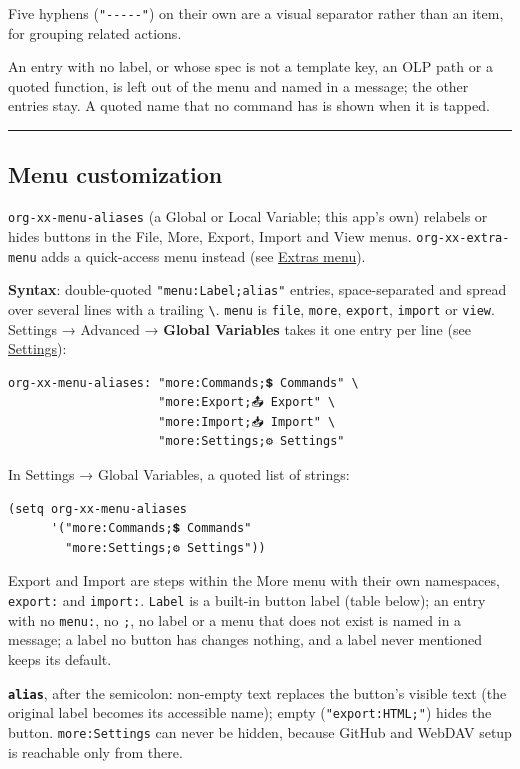 \documentclass[11pt]{article}
\begin{document}
Five hyphens (\texttt{"-{}-{}-{}-{}-"}) on their own are a visual separator rather than an item, for grouping related actions.

An entry with no label, or whose spec is not a template key, an OLP path or a quoted function, is left out of the menu and named in a message; the other entries stay. A quoted name that no command has is shown when it is tapped.

\noindent\rule{\textwidth}{0.5pt}

\subsection{Menu customization}
\label{sec:orgc0b0953}
\texttt{org-xx-menu-aliases} (a Global or Local Variable; this app's own) relabels or hides buttons in the File, More, Export, Import and View menus. \texttt{org-xx-extra-menu} adds a quick-access menu instead (see \hyperref[sec:org147f9a0]{Extras menu}).

\textbf{Syntax}: double-quoted \texttt{"menu:Label;alias"} entries, space-separated and spread over several lines with a trailing \texttt{\textbackslash{}}. \texttt{menu} is \texttt{file}, \texttt{more}, \texttt{export}, \texttt{import} or \texttt{view}. Settings → Advanced → \textbf{Global Variables} takes it one entry per line (see \hyperref[sec:org788d206]{Settings}):

\begin{verbatim}
org-xx-menu-aliases: "more:Commands;💲 Commands" \
                     "more:Export;📤 Export" \
                     "more:Import;📥 Import" \
                     "more:Settings;⚙️ Settings"
\end{verbatim}

In Settings → Global Variables, a quoted list of strings:

\begin{verbatim}
(setq org-xx-menu-aliases
      '("more:Commands;💲 Commands"
        "more:Settings;⚙️ Settings"))
\end{verbatim}

Export and Import are steps within the More menu with their own namespaces, \texttt{export:} and \texttt{import:}. \texttt{Label} is a built-in button label (table below); an entry with no \texttt{menu:}, no \texttt{;}, no label or a menu that does not exist is named in a message; a label no button has changes nothing, and a label never mentioned keeps its default.

\textbf{\texttt{alias}}, after the semicolon: non-empty text replaces the button's visible text (the original label becomes its accessible name); empty (\texttt{"export:HTML;"}) hides the button. \texttt{more:Settings} can never be hidden, because GitHub and WebDAV setup is reachable only from there.
\end{document}
